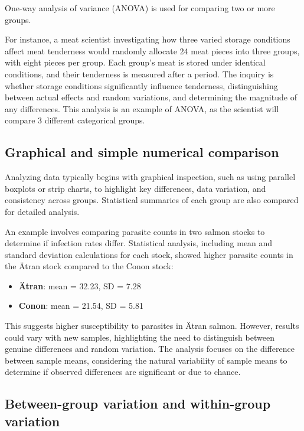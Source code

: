 \documentclass{article}
\begin{document}
One-way analysis of variance (ANOVA) is used for comparing two or more groups. 

For instance, a meat scientist investigating how three varied storage conditions affect meat tenderness would randomly allocate 24 meat pieces into three groups, with eight pieces per group. Each group's meat is stored under identical conditions, and their tenderness is measured after a period. The inquiry is whether storage conditions significantly influence tenderness, distinguishing between actual effects and random variations, and determining the magnitude of any differences. This analysis is an example of ANOVA, as the scientist will compare 3 different categorical groups.

\subsection{Graphical and simple numerical comparison}

Analyzing data typically begins with graphical inspection, such as using parallel boxplots or strip charts, to highlight key differences, data variation, and consistency across groups. Statistical summaries of each group are also compared for detailed analysis.

An example involves comparing parasite counts in two salmon stocks to determine if infection rates differ. Statistical analysis, including mean and standard deviation calculations for each stock, showed higher parasite counts in the Ätran stock compared to the Conon stock:

\begin{itemize}
    \item \textbf{Ätran}: mean = 32.23, SD = 7.28

    \item \textbf{Conon}: mean = 21.54, SD = 5.81 

\end{itemize}

This suggests higher susceptibility to parasites in Ätran salmon. However, results could vary with new samples, highlighting the need to distinguish between genuine differences and random variation. The analysis focuses on the difference between sample means, considering the natural variability of sample means to determine if observed differences are significant or due to chance.

\subsection{Between-group variation and within-group variation}
\end{document}
